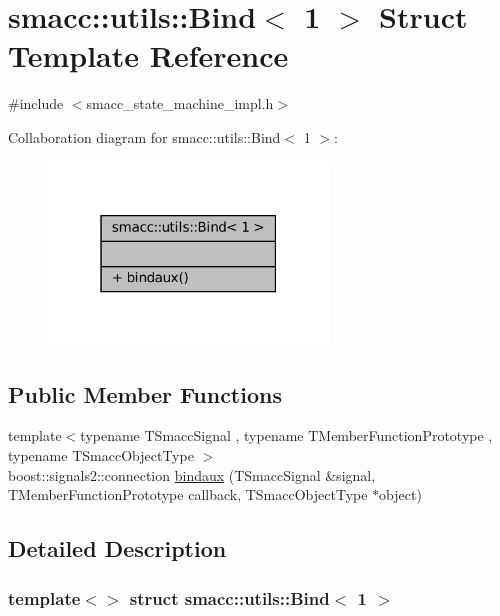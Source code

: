 \hypertarget{structsmacc_1_1utils_1_1Bind_3_011_01_4}{}\section{smacc\+:\+:utils\+:\+:Bind$<$ 1 $>$ Struct Template Reference}
\label{structsmacc_1_1utils_1_1Bind_3_011_01_4}


{\ttfamily \#include $<$smacc\+\_\+state\+\_\+machine\+\_\+impl.\+h$>$}



Collaboration diagram for smacc\+:\+:utils\+:\+:Bind$<$ 1 $>$\+:
\nopagebreak
\begin{figure}[H]
\begin{center}
\leavevmode
\includegraphics[width=211pt]{structsmacc_1_1utils_1_1Bind_3_011_01_4__coll__graph}
\end{center}
\end{figure}
\subsection*{Public Member Functions}
\begin{DoxyCompactItemize}
\item 
{\footnotesize template$<$typename T\+Smacc\+Signal , typename T\+Member\+Function\+Prototype , typename T\+Smacc\+Object\+Type $>$ }\\boost\+::signals2\+::connection \hyperlink{structsmacc_1_1utils_1_1Bind_3_011_01_4_a5704d3cff0b914fc899ff385ff8f8bc2}{bindaux} (T\+Smacc\+Signal \&signal, T\+Member\+Function\+Prototype callback, T\+Smacc\+Object\+Type $\ast$object)
\end{DoxyCompactItemize}


\subsection{Detailed Description}
\subsubsection*{template$<$$>$\newline
struct smacc\+::utils\+::\+Bind$<$ 1 $>$}



